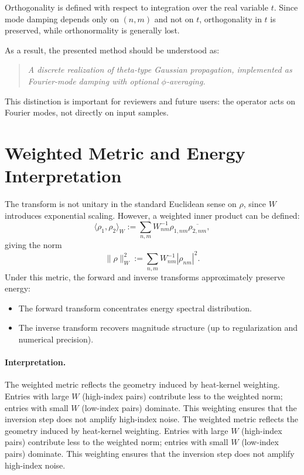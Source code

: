 \documentclass[11pt]{article}
\begin{document}
Orthogonality is defined with respect to integration over the real variable $t$. Since mode damping depends only on $(n,m)$ and not on $t$, orthogonality in $t$ is preserved, while orthonormality is generally lost.

As a result, the presented method should be understood as:
\begin{quote}
    \emph{A discrete realization of theta-type Gaussian propagation, implemented as Fourier-mode damping with optional $\phi$-averaging.}
\end{quote}
This distinction is important for reviewers and future users: the operator acts on Fourier modes, not directly on input samples.

\section{Weighted Metric and Energy Interpretation}
The transform is not unitary in the standard Euclidean sense on $\rho$, since $W$ introduces exponential scaling. However, a weighted inner product can be defined:
\begin{equation}
\langle \rho_1, \rho_2 \rangle_W := \sum_{n,m} W_{nm}^{-1} \rho_{1,nm} \overline{\rho_{2,nm}},
\label{eq:weighted_inner}
\end{equation}
giving the norm
\begin{equation}
\|\rho\|_W^2 := \sum_{n,m} W_{nm}^{-1} |\rho_{nm}|^2.
\label{eq:weighted_norm}
\end{equation}
Under this metric, the forward and inverse transforms approximately preserve energy:
\begin{itemize}
    \item The forward transform concentrates energy spectral distribution.
    \item The inverse transform recovers magnitude structure (up to regularization and numerical precision).
\end{itemize}

\paragraph{Interpretation.}
The weighted metric reflects the geometry induced by heat-kernel weighting. Entries with large $W$ (high-index pairs) contribute less to the weighted norm; entries with small $W$ (low-index pairs) dominate. This weighting ensures that the inversion step does not amplify high-index noise.
The weighted metric reflects the geometry induced by heat-kernel weighting. Entries with large $W$ (high-index pairs) contribute less to the weighted norm; entries with small $W$ (low-index pairs) dominate. This weighting ensures that the inversion step does not amplify high-index noise.
\end{document}
